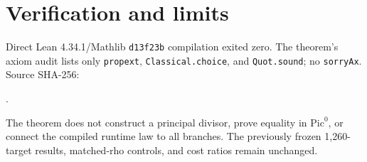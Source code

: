 \documentclass[11pt]{article}
\begin{document}
\section*{Verification and limits}
Direct Lean 4.34.1/Mathlib \texttt{d13f23b} compilation exited zero. The theorem's axiom audit lists only \texttt{propext}, \texttt{Classical.choice}, and \texttt{Quot.sound}; no \texttt{sorryAx}. Source SHA-256:\par\smallskip{}.

The theorem does not construct a principal divisor, prove equality in $\mathrm{Pic}^0$, or connect the compiled runtime law to all branches. The previously frozen 1,260-target results, matched-rho controls, and cost ratios remain unchanged.
\end{document}
